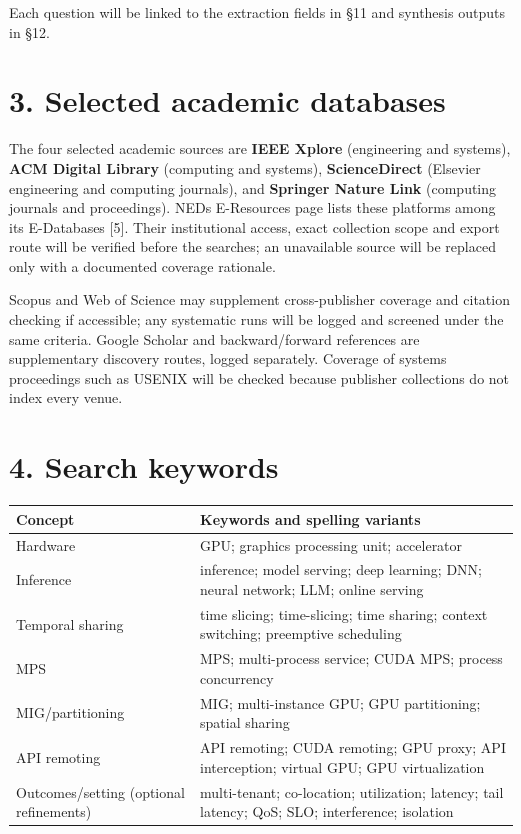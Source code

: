 \documentclass[
  12pt,
]{article}
\begin{document}
Each question will be linked to the extraction fields in §11 and
synthesis outputs in §12.

\hypertarget{3-selected-academic-databases}{%
\section{3. Selected academic
databases}\label{3-selected-academic-databases}}

The four selected academic sources are \textbf{IEEE Xplore} (engineering
and systems), \textbf{ACM Digital Library} (computing and systems),
\textbf{ScienceDirect} (Elsevier engineering and computing journals),
and \textbf{Springer Nature Link} (computing journals and proceedings).
NED\textquotesingle s E-Resources page lists these platforms among its
E-Databases {[}5{]}. Their institutional access, exact collection scope
and export route will be verified before the searches; an unavailable
source will be replaced only with a documented coverage rationale.

Scopus and Web of Science may supplement cross-publisher coverage and
citation checking if accessible; any systematic runs will be logged and
screened under the same criteria. Google Scholar and backward/forward
references are supplementary discovery routes, logged separately.
Coverage of systems proceedings such as USENIX will be checked because
publisher collections do not index every venue.

\hypertarget{4-search-keywords}{%
\section{4. Search keywords}\label{4-search-keywords}}

\begin{longtable}[]{@{}p{}p{}@{}}
\toprule\noalign{}
Concept & Keywords and spelling variants \\
\midrule\noalign{}
\endhead
\bottomrule\noalign{}
\endlastfoot
Hardware & GPU; graphics processing unit; accelerator \\
Inference & inference; model serving; deep learning; DNN; neural
network; LLM; online serving \\
Temporal sharing & time slicing; time-slicing; time sharing; context
switching; preemptive scheduling \\
MPS & MPS; multi-process service; CUDA MPS; process concurrency \\
MIG/partitioning & MIG; multi-instance GPU; GPU partitioning; spatial
sharing \\
API remoting & API remoting; CUDA remoting; GPU proxy; API interception;
virtual GPU; GPU virtualization \\
Outcomes/setting (optional refinements) & multi-tenant; co-location;
utilization; latency; tail latency; QoS; SLO; interference; isolation \\
\end{longtable}
\end{document}
